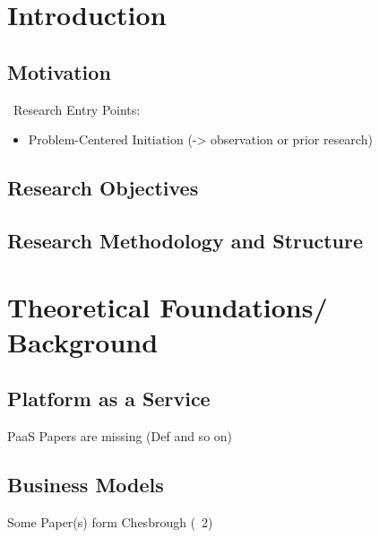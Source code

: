 \chapter{Introduction}

	\section{Motivation}
	
	~\newline Research Entry Points:
	
	\begin{itemize}
		\item Problem-Centered Initiation (-> observation or prior research)
	\end{itemize}
	
	\section{Research Objectives}

	\section{Research Methodology and Structure}

\chapter{Theoretical Foundations/ Background}

	\section{Platform as a Service}
	PaaS Papers are missing (Def and so on)

	\section{Business Models}
	Some Paper(s) form Chesbrough (~2)
	

